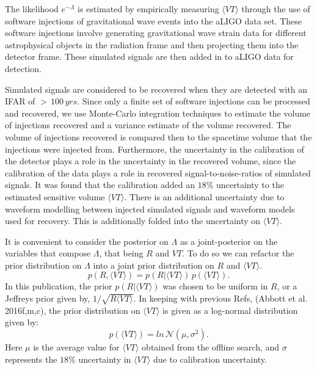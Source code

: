 The likelihood $e^{-\Lambda}$ is estimated by empirically measuring $\langle VT\rangle$ through the use of software injections of gravitational wave events into the aLIGO data set. These software injections involve generating gravitational wave strain data for different astrophysical objects in the radiation frame and then projecting them into the detector frame. These simulated signals are then added in to aLIGO data for detection.

Simulated signals are considered to be recovered when they are detected with an IFAR of $> \, 100 \, yrs$.  Since only a finite set of software injections can be processed and recovered, we use Monte-Carlo integration techniques to estimate the volume of injections recovered and a variance estimate of the volume recovered. The volume of injections recovered is compared then to the spacetime volume that the injections were injected from. Furthermore, the uncertainty in the calibration of the detector plays a role in the uncertainty in the recovered volume, since the calibration of the data plays a role in recovered signal-to-noise-ratios of simulated signals. It was found that the calibration added an $18 \%$ uncertainty to the estimated sensitive volume $\langle VT \rangle$. There is an additional uncertainty due to waveform modelling between injected simulated signals and waveform models used for recovery. This is additionally folded into the uncertainty on $\langle VT \rangle$.

It is convenient to consider the posterior on $\Lambda$ as a joint-posterior on the variables that compose $\Lambda$, that being $R$ and $VT$. To do so we can refactor the prior distribution on $\Lambda$ into a joint prior distribution on $R$ and $\langle VT \rangle$.
\begin{equation}\label{eqn:joint_posterior_simple}
    p\left(R, \langle VT \rangle \right) = p\left(R | \langle VT \rangle\right) \, p\left( \langle VT \rangle \right).
\end{equation}
In this publication, the prior $p\left(R | \langle VT \rangle\right)$ was chosen to be uniform in $R$, or a Jeffreys prior given by, $1/\sqrt{R \langle VT \rangle}$. In keeping with previous Refs, (Abbott et al. 2016f,m,c), the prior distribution on $\langle VT \rangle$ is given as a log-normal distribution given by:
\begin{equation}\label{eqn:prior_vt}
    p\left(\langle VT \rangle \right) =
            ln \, \mathcal{N} \left( \mu, \sigma^2\right).
\end{equation}
Here $\mu$ is the average value for $\langle VT \rangle$ obtained from the offline search, and $\sigma$ represents the $18 \%$ uncertainty in $\langle VT \rangle$ due to calibration uncertainty.

